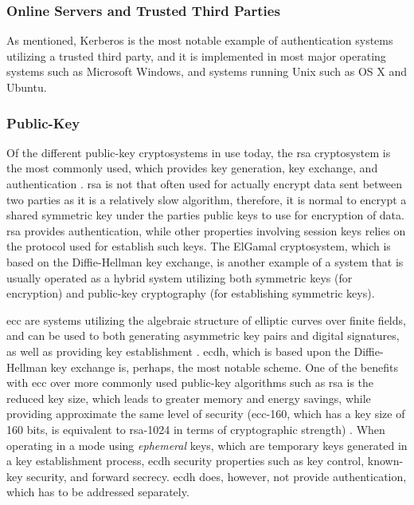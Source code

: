 \subsubsection{Online Servers and Trusted Third Parties}

As mentioned, Kerberos is the most notable example of authentication systems utilizing a trusted third party, and it is implemented in most major operating systems such as Microsoft Windows, and systems running Unix such as OS X and Ubuntu. 


\subsubsection{Public-Key}

Of the different public-key cryptosystems in use today, the \gls{rsa} cryptosystem is the most commonly used, which provides key generation, key exchange, and authentication \cite{wander2005energy}. \gls{rsa} is not that often used for actually encrypt data sent between two parties as it is a relatively slow algorithm, therefore, it is normal to encrypt a shared symmetric key under the parties public keys to use for encryption of data. \gls{rsa} provides authentication, while other properties involving session keys relies on the protocol used for establish such keys. The ElGamal cryptosystem, which is based on the Diffie-Hellman key exchange, is another example of a system that is usually operated as a hybrid system utilizing both symmetric keys (for encryption) and public-key cryptography (for establishing symmetric keys). 

\gls{ecc} are systems utilizing the algebraic structure of elliptic curves over finite fields, and can be used to both generating asymmetric key pairs and digital signatures, as well as providing key establishment \cite{bos2014elliptic}. \gls{ecdh}, which is based upon the Diffie-Hellman key exchange is, perhaps, the most notable scheme. One of the benefits with \gls{ecc} over more commonly used public-key algorithms such as \gls{rsa} is the reduced key size, which leads to greater memory and energy savings, while providing approximate the same level of security (\gls{ecc}-160, which has a key size of 160 bits, is equivalent to \gls{rsa}-1024 in terms of cryptographic strength) \cite{nist2016}.  When operating in a mode using \emph{ephemeral} keys, which are temporary keys generated in a key establishment process, \gls{ecdh} security properties such as key control, known-key security, and forward secrecy. \gls{ecdh} does, however, not provide authentication, which has to be addressed separately. 

